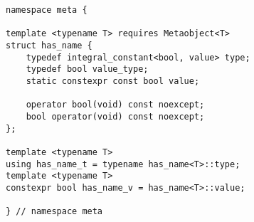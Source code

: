 
\begin{verbatim}
namespace meta {

template <typename T> requires Metaobject<T>
struct has_name {
	typedef integral_constant<bool, value> type;
	typedef bool value_type;
	static constexpr const bool value;

	operator bool(void) const noexcept;
	bool operator(void) const noexcept;
};

template <typename T>
using has_name_t = typename has_name<T>::type;
template <typename T>
constexpr bool has_name_v = has_name<T>::value;

} // namespace meta
\end{verbatim}
